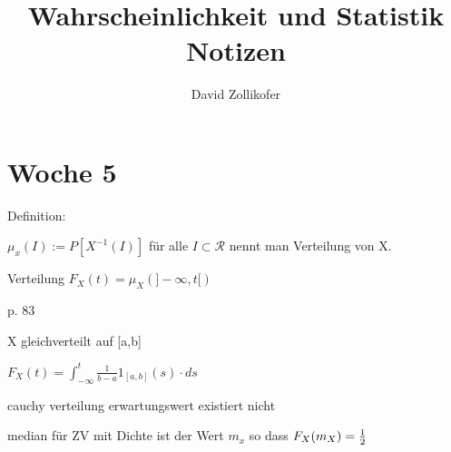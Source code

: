 \documentclass[25pt]{article}
\title{Wahrscheinlichkeit und Statistik Notizen}
\author{David Zollikofer}
\begin{document}
	
	
	\maketitle 
	
	
	
	
	\section*{Woche 5} 
	
	Definition:
	
	$\mu_x (I) := P[X^{-1}(I)]$ für alle $I\subset \mathcal{R}$
	nennt man Verteilung von X.
	
	
	
	Verteilung $F_X(t) = \mu_X(]-\infty,t[)$
	
	
	
	p.  83
	
	
	X gleichverteilt auf [a,b]
	
	$F_X(t) = \int_{-\infty}^{t} \frac{1}{b-a} \mathrm{1}_{[a,b]}(s) \cdot ds$
	
	
	
	cauchy verteilung erwartungswert existiert nicht
	
	
	
	median für ZV mit Dichte ist der Wert $m_x$ so dass $F_X(m_X) = {1 \over 2}$
	
	
	
	
\end{document}
